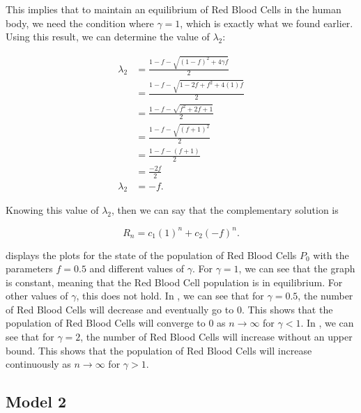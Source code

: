 This implies that to maintain an equilibrium of Red Blood Cells in the human body, we need the condition where $\gamma = 1$, which is exactly what we found earlier. Using this result, we can determine the value of $\lambda_2$:

\begin{align*}
    \lambda_2 &= \frac{1-f - \sqrt{(1-f)^2 + 4\gamma f}}{2}\\
    &= \frac{1-f - \sqrt{1-2f+f^2 + 4(1)f}}{2}\\
    &= \frac{1-f - \sqrt{f^2+2f+1}}{2}\\
    &= \frac{1-f - \sqrt{(f+1)^2}}{2}\\
    &= \frac{1-f - (f+1)}{2}\\
    &= \frac{-2f}{2}\\
    \lambda_2 &= -f.
\end{align*}

Knowing this value of $\lambda_2$, then we can say that the complementary solution is

\begin{equation} \label{eq:7}
    R_n = c_1(1)^n + c_2(-f)^n.
\end{equation}


 displays the plots for the state of the population of Red Blood Cells $P_0$ with the parameters $f=0.5$ and different values of $\gamma$. For $\gamma=1$, we can see that the graph is constant, meaning that the Red Blood Cell population is in equilibrium. For other values of $\gamma$, this does not hold. In , we can see that for $\gamma = 0.5$, the number of Red Blood Cells will decrease and eventually go to 0. This shows that the population of Red Blood Cells will converge to 0 as $n\to\infty$ for $\gamma < 1$. In , we can see that for $\gamma = 2$, the number of Red Blood Cells will increase without an upper bound. This shows that the population of Red Blood Cells will increase continuously as $n\to\infty$ for $\gamma > 1$.

\subsection{Model 2}
\label{subsec:model-2}

